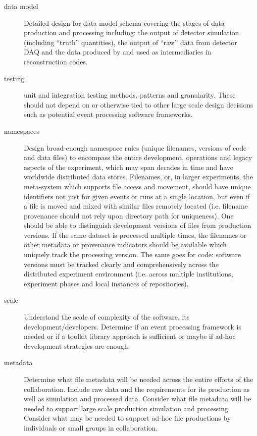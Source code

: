 \begin{description}
\item[data model] Detailed design for data model schema covering the
  stages of data production and processing including: the output of
  detector simulation (including ``truth'' quantities), the output of
  ``raw'' data from detector DAQ and the data produced by and used as
  intermediaries in reconstruction codes.
\item[testing] unit and integration testing methods, patterns and
  granularity.  These should not depend on or otherwise tied to other
  large scale design decisions such as potential event processing
  software frameworks.  

\item[namespaces] Design broad-enough namespace rules (unique filenames, 
versions of code and data files) to encompass the entire development, 
operations and legacy aspects of the experiment, which may span decades 
in time and have worldwide distributed data stores.  Filenames, or, in larger
experiments, the meta-system which supports file access and movement, 
should have unique identifiers not just for given events or runs 
at a single location, but even if a file is moved and mixed 
with similar files remotely located (i.e. filename provenance should 
not rely upon directory path for uniqueness).  One should be able 
to distinguish development versions of files from production versions.  
If the same dataset is processed multiple times, the filenames or 
other metadata or provenance indicators should be available which 
uniquely track the processing version.  The same goes for code:  
software versions must be tracked clearly and comprehensively across the 
distributed experiment environment (i.e. across multiple 
institutions, experiment phases and local instances of repositories).

\item[scale] Understand the scale of complexity of the software, its
  development/developers.  Determine if an event processing framework
  is needed or if a toolkit library approach is sufficient or maybe if
  ad-hoc development strategies are enough.

\item[metadata] Determine what file metadata will be needed across the
  entire efforts of the collaboration.  Include raw data and the
  requirements for its production as well as simulation and processed
  data.  Consider what file metadata will be needed to support large
  scale production simulation and processing.  Consider what may be
  needed to support ad-hoc file productions by individuals or small
  groups in collaboration.

\end{description}






